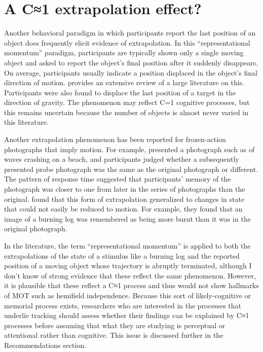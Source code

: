 \documentclass[
]{book}
\begin{document}
\hypertarget{a-c1-extrapolation-effect}{%
\section{A C≈1 extrapolation effect?}\label{a-c1-extrapolation-effect}}

Another behavioral paradigm in which participants report the last position of an object does frequently elicit evidence of extrapolation. In this ``representational momentum'' paradigm, participants are typically shown only a single moving object and asked to report the object's final position after it suddenly disappears. On average, participants usually indicate a position displaced in the object's final direction of motion. \citet{hubbardRepresentationalMomentumRelated2005} provides an extensive review of a large literature on this. Participants were also found to displace the last position of a target in the direction of gravity. The phenomenon may reflect C=1 cognitive processes, but this remains uncertain because the number of objects is almost never varied in this literature.

Another extrapolation phenomenon has been reported for frozen-action photographs that imply motion. For example, \citet{freydMentalRepresentationMovement1983} presented a photograph such as of waves crashing on a beach, and participants judged whether a subsequently presented probe photograph was the same as the original photograph or different. The pattern of response time suggested that participants' memory of the photograph was closer to one from later in the series of photographs than the original. \citet{hafriMeltingIceYour2022} found that this form of extrapolation generalized to changes in state that could not easily be reduced to motion. For example, they found that an image of a burning log was remembered as being more burnt than it was in the original photograph.

In the literature, the term ``representational momentum'' is applied to both the extrapolations of the state of a stimulus like a burning log and the reported position of a moving object whose trajectory is abruptly terminated, although I don't know of strong evidence that these reflect the same phenomenon. However, it is plausible that these reflect a C≈1 process and thus would not show hallmarks of MOT such as hemifield independence. Because this sort of likely-cognitive or memorial process exists, researchers who are interested in the processes that underlie tracking should assess whether their findings can be explained by C≈1 processes before assuming that what they are studying is perceptual or attentional rather than cognitive. This issue is discussed further in the Recommendations section.
\end{document}
